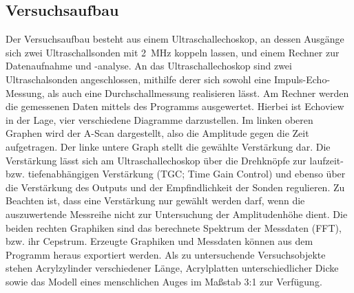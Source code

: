 \subsection{Versuchsaufbau}
\label{sec:Versuchsaufbau}
Der Versuchsaufbau besteht aus einem Ultraschallechoskop, an dessen Ausgänge sich zwei Ultraschallsonden mit \SI{2}{\mega\Hz} koppeln lassen, und einem Rechner zur Datenaufnahme und -analyse.
An das Ultraschallechoskop sind zwei Ultraschalsonden angeschlossen, mithilfe derer sich sowohl eine Impuls-Echo-Messung, als auch eine Durchschallmessung realisieren lässt.
Am Rechner werden die gemessenen Daten mittels des Programms  ausgewertet.
Hierbei ist Echoview in der Lage, vier verschiedene Diagramme darzustellen.
Im linken oberen Graphen wird der A-Scan dargestellt, also die Amplitude gegen die Zeit aufgetragen.
Der linke untere Graph stellt die gewählte Verstärkung dar. Die Verstärkung lässt sich am Ultraschallechoskop über die Drehknöpfe zur laufzeit-bzw. tiefenabhängigen Verstärkung (TGC; Time Gain Control) und ebenso über die Verstärkung des Outputs und der Empfindlichkeit der Sonden regulieren.
Zu Beachten ist, dass eine Verstärkung nur gewählt werden darf, wenn die auszuwertende Messreihe nicht zur Untersuchung der Amplitudenhöhe dient.
Die beiden rechten Graphiken sind das berechnete Spektrum der Messdaten (FFT), bzw. ihr
Cepstrum.
Erzeugte Graphiken und Messdaten können aus dem Programm heraus exportiert werden.
Als zu untersuchende Versuchsobjekte stehen Acrylzylinder verschiedener Länge, Acrylplatten unterschiedlicher Dicke sowie das Modell eines menschlichen Auges im Maßstab 3:1 zur Verfügung.
